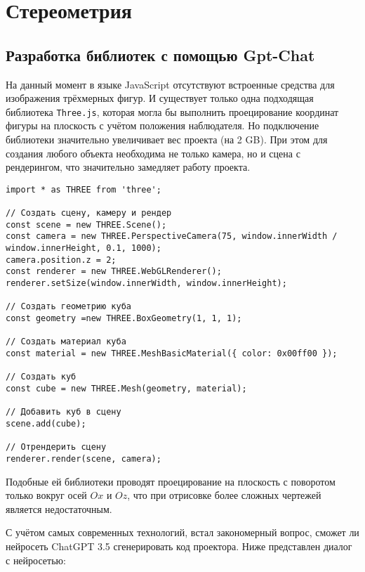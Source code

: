 \section{Стереометрия}\label{2sect}
\subsection{Разработка библиотек с помощью Gpt-Chat}

На данный момент в языке JavaScript отсутствуют встроенные средства для изображения трёхмерных фигур. И существует только одна подходящая библиотека \texttt{Three.js}, которая могла бы выполнить проецирование координат фигуры на плоскость с учётом положения наблюдателя. Но подключение библиотеки значительно увеличивает вес проекта (на 2 GB). При этом для создания любого объекта необходима не только камера, но и сцена с рендерингом, что значительно замедляет работу проекта.

\begin{lstlisting}[caption={Код необходыимый для отриосовки куба}]
import * as THREE from 'three';

// Создать сцену, камеру и рендер
const scene = new THREE.Scene();
const camera = new THREE.PerspectiveCamera(75, window.innerWidth / window.innerHeight, 0.1, 1000);
camera.position.z = 2;
const renderer = new THREE.WebGLRenderer();
renderer.setSize(window.innerWidth, window.innerHeight);

// Создать геометрию куба
const geometry =new THREE.BoxGeometry(1, 1, 1);

// Создать материал куба
const material = new THREE.MeshBasicMaterial({ color: 0x00ff00 });

// Создать куб
const cube = new THREE.Mesh(geometry, material);

// Добавить куб в сцену
scene.add(cube);

// Отрендерить сцену
renderer.render(scene, camera);

\end{lstlisting}


Подобные ей библиотеки проводят проецирование на плоскость с поворотом только вокруг осей $Ox$ и $Oz$, что при отрисовке более сложных чертежей является недостаточным.

С учётом самых современных технологий, встал закономерный вопрос, сможет ли нейросеть ChatGPT 3.5 сгенерировать код проектора. Ниже представлен диалог с нейросетью:

